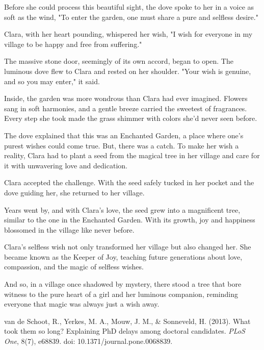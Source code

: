 \documentclass[10pt, a4paper, titlepage]{article}
\begin{document}
Before she could process this beautiful sight, the dove spoke to her in a voice as soft as the wind, "To enter the garden, one must share a pure and selfless desire."

Clara, with her heart pounding, whispered her wish, "I wish for everyone in my village to be happy and free from suffering."

The massive stone door, seemingly of its own accord, began to open. The luminous dove flew to Clara and rested on her shoulder. "Your wish is genuine, and so you may enter," it said.

Inside, the garden was more wondrous than Clara had ever imagined. Flowers sang in soft harmonies, and a gentle breeze carried the sweetest of fragrances. Every step she took made the grass shimmer with colors she'd never seen before.

The dove explained that this was an Enchanted Garden, a place where one’s purest wishes could come true. But, there was a catch. To make her wish a reality, Clara had to plant a seed from the magical tree in her village and care for it with unwavering love and dedication.

Clara accepted the challenge. With the seed safely tucked in her pocket and the dove guiding her, she returned to her village.

Years went by, and with Clara's love, the seed grew into a magnificent tree, similar to the one in the Enchanted Garden. With its growth, joy and happiness blossomed in the village like never before.

Clara's selfless wish not only transformed her village but also changed her. She became known as the Keeper of Joy, teaching future generations about love, compassion, and the magic of selfless wishes.

And so, in a village once shadowed by mystery, there stood a tree that bore witness to the pure heart of a girl and her luminous companion, reminding everyone that magic was always just a wish away.


\begin{thebibliography}{9}

van de Schoot, R., Yerkes, M. A., Mouw, J. M., \& Sonneveld, H. (2013).
What took them so long? Explaining PhD delays among doctoral candidates.
\textit{PLoS One}, 8(7), e68839. 
doi: 10.1371/journal.pone.0068839.

\end{thebibliography}
\end{document}
